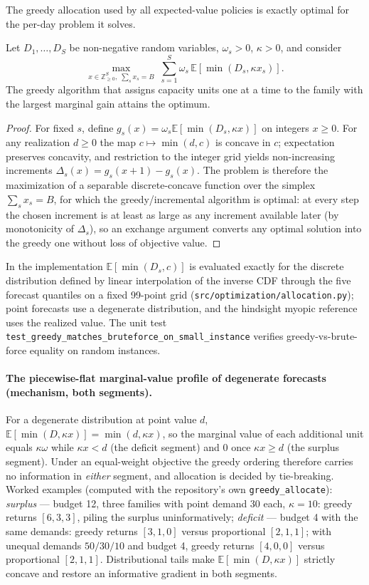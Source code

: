 The greedy allocation used by all expected-value policies is exactly
optimal for the per-day problem it solves.

\begin{proposition}
Let $D_1,\dots,D_S$ be non-negative random variables, $\omega_s > 0$,
$\kappa > 0$, and consider
\[
  \max_{x \in \mathbb{Z}_{\ge 0}^S, \; \sum_s x_s = B}
  \; \sum_{s=1}^S \omega_s\, \mathbb{E}\!\left[\min(D_s, \kappa x_s)\right].
\]
The greedy algorithm that assigns capacity units one at a time to the family with
the largest marginal gain attains the optimum.
\end{proposition}

\begin{proof}
For fixed $s$, define $g_s(x) = \omega_s \mathbb{E}[\min(D_s, \kappa x)]$
on integers $x \ge 0$. For any realization $d \ge 0$ the map
$c \mapsto \min(d, c)$ is concave in $c$; expectation preserves concavity,
and restriction to the integer grid yields non-increasing increments
$\Delta_s(x) = g_s(x+1) - g_s(x)$. The problem is therefore the
maximization of a separable discrete-concave function over the simplex
$\sum_s x_s = B$, for which the greedy/incremental algorithm is optimal:
at every step the chosen increment is at least as large as any increment
available later (by monotonicity of $\Delta_s$), so an exchange argument
converts any optimal solution into the greedy one without loss of
objective value.
\end{proof}

In the implementation $\mathbb{E}[\min(D_s, c)]$ is evaluated exactly for
the discrete distribution defined by linear interpolation of the inverse
CDF through the five forecast quantiles on a fixed 99-point grid
(\texttt{src/optimization/allocation.py}); point forecasts use a
degenerate distribution, and the hindsight myopic reference uses the realized value. The unit
test \texttt{test\_greedy\_matches\_bruteforce\_on\_small\_instance}
verifies greedy-vs-brute-force equality on random instances.


\paragraph{The piecewise-flat marginal-value profile of degenerate
forecasts (mechanism, both segments).} For a degenerate distribution at
point value $d$, $\mathbb{E}[\min(D, \kappa x)] = \min(d, \kappa x)$,
so the marginal value of each additional unit equals $\kappa\omega$
while $\kappa x < d$ (the deficit segment) and $0$ once $\kappa x \ge
d$ (the surplus segment). Under an equal-weight objective the greedy ordering
therefore carries no information in \emph{either} segment, and
allocation is decided by tie-breaking. Worked examples (computed with
the repository's own \texttt{greedy\_allocate}): \emph{surplus} ---
budget 12, three families with point demand 30 each, $\kappa = 10$:
greedy returns $[6,3,3]$, piling the surplus uninformatively;
\emph{deficit} --- budget 4 with the same demands: greedy returns
$[3,1,0]$ versus proportional $[2,1,1]$; with unequal demands
$50/30/10$ and budget 4, greedy returns $[4,0,0]$ versus proportional
$[2,1,1]$. Distributional tails make
$\mathbb{E}[\min(D, \kappa x)]$ strictly concave and restore an
informative gradient in both segments.
